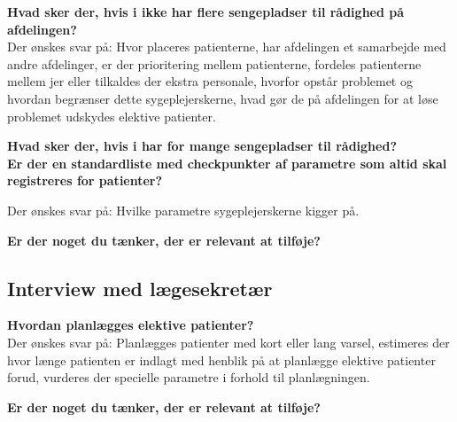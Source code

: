 \noindent
\textbf{Hvad sker der, hvis i ikke har flere sengepladser til rådighed på afdelingen?} \\
\noindent
Der ønskes svar på: Hvor placeres patienterne, har afdelingen et samarbejde med andre afdelinger, er der prioritering mellem patienterne, fordeles patienterne mellem jer eller tilkaldes der ekstra personale, hvorfor opstår problemet og hvordan begrænser dette sygeplejerskerne, hvad gør de på afdelingen for at løse problemet udskydes elektive patienter. 

\noindent
\textbf{Hvad sker der, hvis i har for mange sengepladser til rådighed?} \\

\noindent
\textbf{Er der en standardliste med checkpunkter af parametre som altid skal registreres for patienter?} 


\noindent
Der ønskes svar på: Hvilke parametre sygeplejerskerne kigger på. 

\noindent
\textbf{Er der noget du tænker, der er relevant at tilføje?}

\subsection{Interview med lægesekretær}
\textbf{Hvordan planlægges elektive patienter?} \\
\noindent
Der ønskes svar på: Planlægges patienter med kort eller lang varsel, estimeres der hvor længe patienten er indlagt med henblik på at planlægge elektive patienter forud, vurderes der specielle parametre i forhold til planlægningen. 

\noindent
\textbf{Er der noget du tænker, der er relevant at tilføje?} \\




